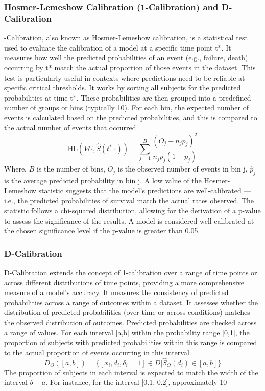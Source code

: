 \subsubsection{Hosmer-Lemeshow Calibration (1-Calibration) and D-Calibration}
-Calibration, also known as Hosmer-Lemeshow calibration, is a statistical test used to evaluate the calibration of a model at a specific time point t*. It measures how well the predicted probabilities of an event (e.g., failure, death) occurring by t* match the actual proportion of those events in the dataset. This test is particularly useful in contexts where predictions need to be reliable at specific critical thresholds. It works by sorting all subjects for the predicted probabilities at time t*. These probabilities are then grouped into a predefined number of groups or bins (typically 10). For each bin, the expected number of events is calculated based on the predicted probabilities, and this is compared to the actual number of events that occurred.
\[\text{HL}(VU, \hat{S}(t^* | \cdot)) = \sum_{j=1}^B \frac{(O_j - n_j \bar{p}_j)^2}{n_j \bar{p}_j (1 - \bar{p}_j)}\]
\noindent Where, \(B\) is the number of bins, \(O_{j}\) is the observed number of events in bin j, \(\hat{p}_{j}\) is the average predicted probability in bin j.
\noindent A low value of the Hosmer-Lemeshow statistic suggests that the model's predictions are well-calibrated — i.e., the predicted probabilities of survival match the actual rates observed. The statistic follows a chi-squared distribution, allowing for the derivation of a p-value to assess the significance of the results. A model is considered well-calibrated at the chosen significance level if the p-value is greater than 0.05.

\subsubsection{D-Calibration}
\noindent D-Calibration extends the concept of 1-calibration over a range of time points or across different distributions of time points, providing a more comprehensive measure of a model's accuracy. It measures the consistency of predicted probabilities across a range of outcomes within a dataset. It assesses whether the distribution of predicted probabilities (over time or across conditions) matches the observed distribution of outcomes. Predicted probabilities are checked across a range of values. For each interval [a,b] within the probability range [0,1], the proportion of subjects with predicted probabilities within this range is compared to the actual proportion of events occurring in this interval.
\[D_{\Theta}([a, b]) = \{[x_i, d_i, \delta_i = 1] \in D | \hat{S}_{\Theta}(d_i) \in [a, b]\}\]
\noindent The proportion of subjects in each interval is expected to match the width of the interval \(b-a\). For instance, for the interval [0.1, 0.2], approximately 10%

